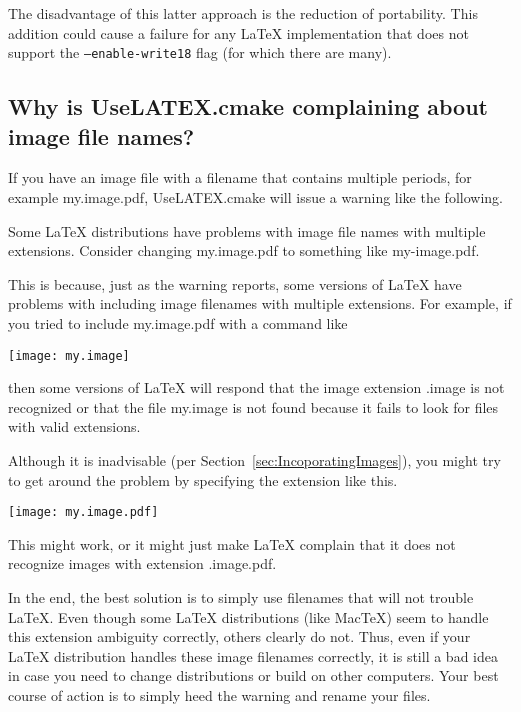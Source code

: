 \documentclass{article}
\newcommand*{\textfile}[1]{\textsf{#1}}
\newcommand*{\textcmake}[1]{\texttt{#1}}
\newcommand*{\UseLATEX}{\textfile{UseLATEX.cmake}\xspace}
\newcommand*{\latex}{\LaTeX\xspace}
\newcommand*{\mactex}{Mac\TeX\xspace}
\begin{document}
  The disadvantage of this latter approach is the reduction of portability.
  This addition could cause a failure for any \latex implementation that
  does not support the \textcmake{--enable-write18} flag (for which there
  are many).

  \subsection{Why is \UseLATEX complaining about image file names?}
  \label{sec:Why_is_UseLATEX_complaining_about_image_file_names}

  If you have an image file with a filename that contains multiple periods,
  for example \textfile{my.image.pdf}, \UseLATEX will issue a warning like
  the following.

  \begin{CodeListing}
Some LaTeX distributions have problems with image file names
with multiple extensions.  Consider changing my.image.pdf to
something like my-image.pdf.
  \end{CodeListing}

  This is because, just as the warning reports, some versions of \latex
  have problems with including image filenames with multiple extensions.
  For example, if you tried to include \textfile{my.image.pdf} with a
  command like
  \begin{CodeListing}
\texttt{[image: my.image]}
  \end{CodeListing}
  then some versions of \latex will respond that the image extension
  \textfile{.image} is not recognized or that the file \textfile{my.image}
  is not found because it fails to look for files with valid extensions.

  Although it is inadvisable (per Section~\ref{sec:IncoporatingImages}),
  you might try to get around the problem by specifying the extension like
  this.
  \begin{CodeListing}
\texttt{[image: my.image.pdf]}
  \end{CodeListing}
  This might work, or it might just make \latex complain that it does not
  recognize images with extension \textfile{.image.pdf}.

  In the end, the best solution is to simply use filenames that will not
  trouble \latex.  Even though some \latex distributions (like \mactex)
  seem to handle this extension ambiguity correctly, others clearly do
  not.  Thus, even if your \latex distribution handles these image
  filenames correctly, it is still a bad idea in case you need to change
  distributions or build on other computers.  Your best course of action is
  to simply heed the warning and rename your files.
\end{document}
